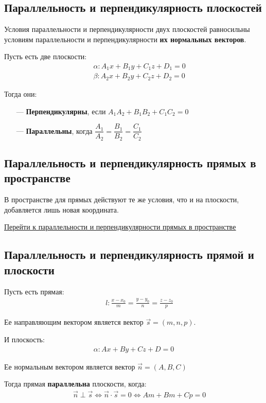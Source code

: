 \documentclass[12pt, fleqn]{extarticle}
\begin{document}
\subsection*{Параллельность и перпендикулярность плоскостей}
Условия параллельности и перпендикулярности двух плоскостей равносильны условиям параллельности и перпендикулярности \textbf{их нормальных векторов}.

Пусть есть две плоскости:
\begin{align*}
     &  &
    \alpha: A_1x + B_1y + C_1z + D_1 = 0 \\
     &  &
    \beta: A_2x + B_2y + C_2z + D_2 = 0
\end{align*}

Тогда они:
\begin{itemize}
    \item[—]{\textbf{Перпендикулярны}, если \(A_1A_2 + B_1B_2 + C_1C_2 = 0\)}
    \item[—]{\textbf{Параллельны}, когда \(\dfrac{A_1}{A_2} = \dfrac{B_1}{B_2} = \dfrac{C_1}{C_2}\)}
\end{itemize}

\subsection*{Параллельность и перпендикулярность прямых в пространстве}
В пространстве для прямых действуют те же условия, что и на плоскости, добавляется лишь новая координата.

\hyperref[sec:parallel_perpendicular_lines]{\underline{Перейти к параллельности и перпендикулярности прямых в пространстве}}

\subsection*{Параллельность и перпендикулярность прямой и плоскости}
Пусть есть прямая:
\begin{align*}
     &  &
    l: \frac{x - x_0}{m} = \frac{y - y_0}{n} = \frac{z - z_0}{p}
\end{align*}

Ее направляющим вектором является вектор \(\overrightarrow{s} = (m, n, p)\).

И плоскость:
\begin{align*}
    \alpha: Ax + By + Cz + D = 0
\end{align*}

Ее нормальным вектором является вектор \(\overrightarrow{n} = (A, B, C)\)

Тогда прямая \textbf{параллельна} плоскости, когда:
\begin{align*}
     &  &
    \overrightarrow{n} \perp \overrightarrow{s} \iff \overrightarrow{n} \cdot \overrightarrow{s} = 0 \iff Am + Bm + Cp = 0
\end{align*}
\end{document}
